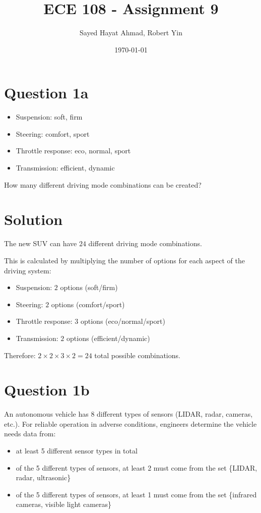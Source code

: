 \documentclass[12pt]{article}
\title{ECE 108 - Assignment 9}
\author{Sayed Hayat Ahmad, Robert Yin}
\date{\today}
\begin{document}
\maketitle

\section*{Question 1a}


\begin{itemize}
    \item Suspension: soft, firm
    \item Steering: comfort, sport
    \item Throttle response: eco, normal, sport
    \item Transmission: efficient, dynamic
\end{itemize}

How many different driving mode combinations can be created? 

\section*{Solution}

The new SUV can have $24$ different driving mode combinations.

This is calculated by multiplying the number of options for each aspect of the driving system:
\begin{itemize}
    \item Suspension: $2$ options (soft/firm)
    \item Steering: $2$ options (comfort/sport)
    \item Throttle response: $3$ options (eco/normal/sport)
    \item Transmission: $2$ options (efficient/dynamic)
\end{itemize}

Therefore: $2 \times 2 \times 3 \times 2 = 24$ total possible combinations.

\section*{Question 1b}

An autonomous vehicle has 8 different types of sensors (LIDAR, radar, cameras, etc.). For reliable operation in adverse conditions, engineers determine the vehicle needs data from:
\begin{itemize}
    \item at least 5 different sensor types in total 
    \item of the 5 different types of sensors, at least 2 must come from the set \{LIDAR, radar, ultrasonic\}
    \item of the 5 different types of sensors, at least 1 must come from the set \{infrared cameras, visible light cameras\}
\end{itemize}
\end{document}
